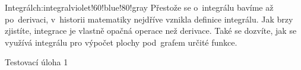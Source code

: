 \begin{chapterintro}{Integrál}{ch:integral}{violet!60!blue!80!gray}{}
    Přestože se o~integrálu bavíme až po~derivaci, v~historii matematiky nejdříve
    vznikla definice integrálu.
    Jak brzy zjistíte, integrace je vlastně opačná operace než derivace.
    Také se dozvíte, jak se využívá integrálu pro výpočet plochy pod~grafem určité
    funkce.
\end{chapterintro}

\begin{exercise}
    Testovací úloha 1
\end{exercise}